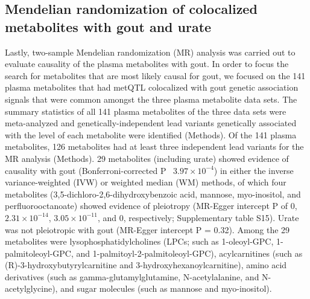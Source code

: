 \documentclass[gucdd,article,submit,pdftex,moreauthors]{Definitions/mdpi}
\begin{document}
\subsection{Mendelian randomization of colocalized metabolites with gout and urate}
Lastly, two-sample Mendelian randomization (MR) analysis was carried out to evaluate causality of the plasma metabolites with gout.
In order to focus the search for metabolites that are most likely causal for gout, we focused on the 141 plasma metabolites that had metQTL colocalized with gout genetic association signals that were common amongst the three plasma metabolite data sets.
The summary statistics of all 141 plasma metabolites of the three data sets were meta-analyzed and genetically-independent lead variants genetically associated with the level of each metabolite were identified (Methods).
Of the 141 plasma metabolites, 126 metabolites had at least three independent lead variants for the MR analysis (Methods).
29 metabolites (including urate) showed evidence of causality with gout (Bonferroni-corrected P \le\ $3.97\times10^{-4}$) in either the inverse variance-weighted (IVW) or weighted median (WM) methods, of which four metabolites (3,5-dichloro-2,6-dihydroxybenzoic acid, mannose, myo-inositol, and perfluorooctanoate) showed evidence of pleiotropy (MR-Egger intercept P of 0, $2.31\times10^{-14}$, $3.05\times10^{-11}$, and 0, respectively; Supplementary table S15).
Urate was not pleiotropic with gout (MR-Egger intercept P = 0.32).
Among the 29 metabolites were lysophosphatidylcholines (LPCs; such as 1-oleoyl-GPC, 1-palmitoleoyl-GPC, and 1-palmitoyl-2-palmitoleoyl-GPC), acylcarnitines (such as (R)-3-hydroxybutyrylcarnitine and 3-hydroxyhexanoylcarnitine), amino acid derivatives (such as gamma-glutamylglutamine, N-acetylalanine, and N-acetylglycine), and sugar molecules (such as mannose and myo-inositol).
\end{document}
